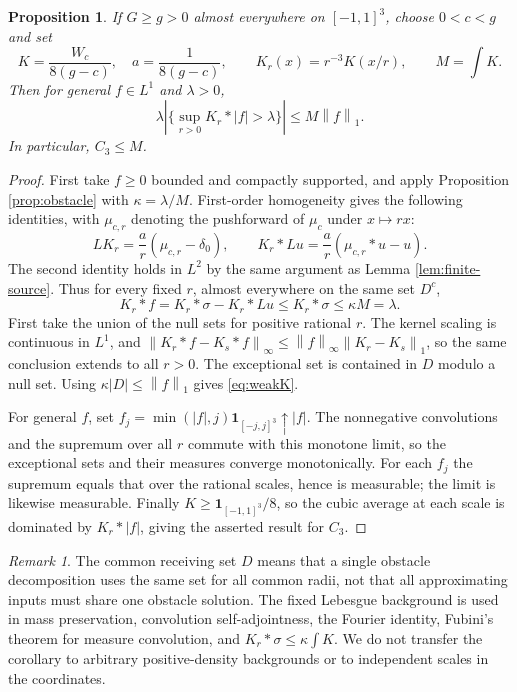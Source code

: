 \documentclass[11pt,a4paper]{article}
\newtheorem{proposition}[theorem]{Proposition}
\theoremstyle{definition}\newtheorem{definition}[theorem]{Definition}
\theoremstyle{remark}\newtheorem{remark}[theorem]{Remark}
\newcommand{\one}{\mathbf 1}
\newcommand{\norm}[1]{\left\lVert#1\right\rVert}
\newcommand{\abs}[1]{\left|#1\right|}
\begin{document}
\begin{proposition}\label{prop:comparison}
If $G\ge g>0$ almost everywhere on $[-1,1]^3$, choose $0<c<g$ and set
\begin{equation}\label{eq:kernel}
 K=\frac{W_c}{8(g-c)},\quad a=\frac1{8(g-c)},
 \qquad K_r(x)=r^{-3}K(x/r),\qquad M=\int K.
\end{equation}
Then for general $f\in L^1$ and $\lambda>0$,
\begin{equation}\label{eq:weakK}
 \lambda\abs{\{\sup_{r>0}K_r*\abs f>\lambda\}}\le M\norm f_1.
\end{equation}
In particular, $C_3\le M$.
\end{proposition}
\begin{proof}
First take $f\ge0$ bounded and compactly supported, and apply Proposition \ref{prop:obstacle} with $\kappa=\lambda/M$. First-order homogeneity gives the following identities, with $\mu_{c,r}$ denoting the pushforward of $\mu_c$ under $x\mapsto rx$:
\[
 LK_r=\frac a r(\mu_{c,r}-\delta_0),\qquad
 K_r*Lu=\frac a r(\mu_{c,r}*u-u).
\]
The second identity holds in $L^2$ by the same argument as Lemma \ref{lem:finite-source}. Thus for every fixed $r$, almost everywhere on the same set $D^c$,
\[
 K_r*f=K_r*\sigma-K_r*Lu\le K_r*\sigma\le\kappa M=\lambda.
\]
First take the union of the null sets for positive rational $r$. The kernel scaling is continuous in $L^1$, and
$\norm{K_r*f-K_s*f}_\infty\le\norm f_\infty\norm{K_r-K_s}_1$,
so the same conclusion extends to all $r>0$. The exceptional set is contained in $D$ modulo a null set. Using $\kappa\abs D\le\norm f_1$ gives \eqref{eq:weakK}.

For general $f$, set $f_j=\min(\abs f,j)\one_{[-j,j]^3}\uparrow\abs f$.
The nonnegative convolutions and the supremum over all $r$ commute with this monotone limit, so the exceptional sets and their measures converge monotonically. For each $f_j$ the supremum equals that over the rational scales, hence is measurable; the limit is likewise measurable. Finally $K\ge\one_{[-1,1]^3}/8$, so the cubic average at each scale is dominated by $K_r*\abs f$, giving the asserted result for $C_3$.
\end{proof}

\begin{remark}
The common receiving set $D$ means that a single obstacle decomposition uses the same set for all common radii, not that all approximating inputs must share one obstacle solution. The fixed Lebesgue background is used in mass preservation, convolution self-adjointness, the Fourier identity, Fubini's theorem for measure convolution, and $K_r*\sigma\le\kappa\int K$. We do not transfer the corollary to arbitrary positive-density backgrounds or to independent scales in the coordinates.
\end{remark}
\end{document}
